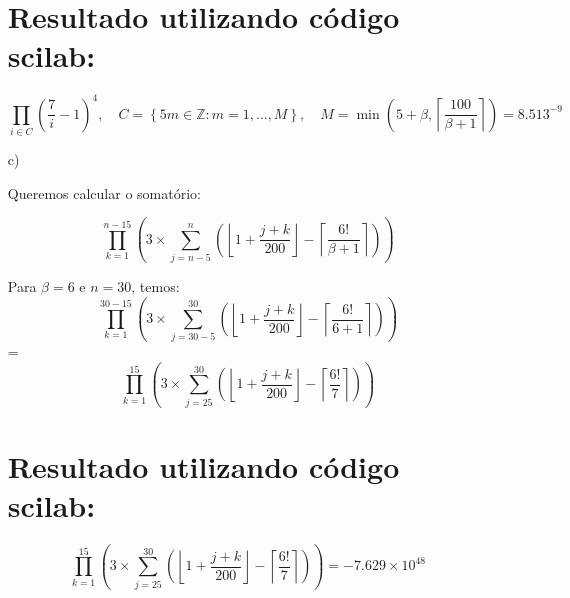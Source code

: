 \begin{enumerate}
\section*{Resultado utilizando  código scilab:}

\[
\prod_{i \in C} \left( \frac{7}{i } -1 \right)^4, \quad C = \left\{ 5m \in \mathbb{Z}: m = 1, \dots, M \right\}, \quad M = \min \left( 5 + \beta, \left\lceil \frac{100}{\beta + 1} \right\rceil \right) = 8.513^{-9}
\]

 \vspace{2em}
      \item[c)]

    Queremos calcular o somatório:

      \[
\prod_{k=1}^{n-15} \left( 3 \times \sum_{j=n-5}^{n} \left( \left\lfloor 1 + \frac{j + k}{200} \right\rfloor - \left\lceil \frac{6!}{\beta + 1} \right\rceil \right) \right)
\]

    Para \(\beta = 6\) e \(n = 30\), temos:
  \[
\prod_{k=1}^{30-15} \left( 3 \times \sum_{j=30-5}^{30} \left( \left\lfloor 1 + \frac{j + k}{200} \right\rfloor - \left\lceil \frac{6!}{6 + 1} \right\rceil \right) \right)
\]
 = \[
\prod_{k=1}^{15} \left( 3 \times \sum_{j=25}^{30} \left( \left\lfloor 1 + \frac{j + k}{200} \right\rfloor - \left\lceil \frac{6!}{7} \right\rceil \right) \right)
\]

\section*{Resultado utilizando  código scilab:}
\[
\prod_{k=1}^{15} \left( 3 \times \sum_{j=25}^{30} \left( \left\lfloor 1 + \frac{j + k}{200} \right\rfloor - \left\lceil \frac{6!}{7} \right\rceil \right) \right) = -7.629 \times 10^{48}
\] 

\end{enumerate}


